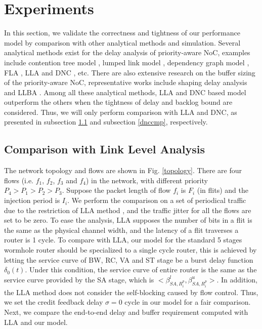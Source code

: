 \documentclass[10pt,journal]{IEEEtran}
\begin{document}
\section{Experiments}\label{experiments}
In this section, we validate the correctness and tightness of our performance model by comparison with other analytical methods and simulation. Several analytical methods exist for the delay analysis of priority-aware NoC, examples include contention tree model \cite{LuJS05}, lumped link model \cite{707545}, dependency graph model \cite{708526}, FLA \cite{Shi:2008:RCA:1397757.1397996}, LLA \cite{73} and DNC \cite{Qian489900}, etc. There are also extensive research on the buffer sizing of the priority-aware NoC, representative works include shaping delay analysis \cite{Manolache:2006:BSO:1131481.1131683} and LLBA \cite{189}. Among all these analytical methods, LLA \cite{73}\cite{189} and DNC \cite{Qian489900} based model outperform the others when the tightness of delay and backlog bound are considered. Thus, we will only perform comparison with LLA and DNC, as presented in subsection \ref{llacmp} and subsection \ref{dnccmp}, respectively.

\subsection{Comparison with Link Level Analysis}\label{llacmp}
The network topology and flows are shown in Fig. \ref{topology}. There are four flows (i.e. $f_1$, $f_2$, $f_3$ and $f_4$) in the network, with different priority $P_4>P_1>P_2>P_3$. Suppose the packet length of flow $f_i$ is $F_i$ (in flits) and the injection period is $I_i$. We perform the comparison on a set of periodical traffic due to the restriction of LLA method \cite{73}\cite{189}, and the traffic jitter for all the flows are set to be zero. To ease the analysis, LLA supposes the number of bits in a flit is the same as the physical channel width, and the latency of a flit traverses a router is 1 cycle. To compare with LLA, our model for the standard 5 stages wormhole router should be specialized to a single cycle router, this is achieved by letting the service curve of BW, RC, VA and ST stage be a burst delay function $\delta_0(t)$. Under this condition, the service curve of entire router is the same as the service curve provided by the SA stage, which is $<\beta_{SA,R_i^p}^l,\beta_{SA,R_i^p}^u>$. In addition, the LLA method does not consider the self-blocking caused by flow control. Thus, we set the credit feedback delay $\sigma=0$ cycle in our model for a fair comparison. Next, we compare the end-to-end delay and buffer requirement computed with LLA and our model.
\end{document}
